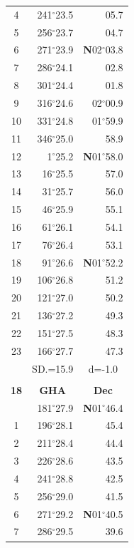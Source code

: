 \documentclass[10pt, a4paper]{report}
\begin{document}
\begin{scriptsize}
\begin{tabular*}{0.2\textwidth}[t]{@{\extracolsep{\fill}}|c|rr|}
4 & 241$^\circ$23.5 & 05.7\\
5 & 256$^\circ$23.7 & 04.7\\[2Pt]
6 & 271$^\circ$23.9 & \textbf{N}02$^\circ$03.8\\
7 & 286$^\circ$24.1 & 02.8\\
8 & 301$^\circ$24.4 & 01.8\\
9 & 316$^\circ$24.6 & 02$^\circ$00.9\\
10 & 331$^\circ$24.8 & 01$^\circ$59.9\\
11 & 346$^\circ$25.0 & 58.9\\[2Pt]
12 & 1$^\circ$25.2 & \textbf{N}01$^\circ$58.0\\
13 & 16$^\circ$25.5 & 57.0\\
14 & 31$^\circ$25.7 & 56.0\\
15 & 46$^\circ$25.9 & \raisebox{0.24ex}{\boldmath$\cdot$~\boldmath$\cdot$~~}55.1\\
16 & 61$^\circ$26.1 & 54.1\\
17 & 76$^\circ$26.4 & 53.1\\[2Pt]
18 & 91$^\circ$26.6 & \textbf{N}01$^\circ$52.2\\
19 & 106$^\circ$26.8 & 51.2\\
20 & 121$^\circ$27.0 & 50.2\\
21 & 136$^\circ$27.2 & \raisebox{0.24ex}{\boldmath$\cdot$~\boldmath$\cdot$~~}49.3\\
22 & 151$^\circ$27.5 & 48.3\\
23 & 166$^\circ$27.7 & 47.3\\
\hline
\rule{0pt}{2.4ex} & \multicolumn{1}{c}{SD.=15.9} & \multicolumn{1}{c|}{d=-1.0}\\
\hline
\multicolumn{1}{c}{}\\[-0.5ex]\hline
\multicolumn{1}{|c|}{\rule{0pt}{2.6ex}\textbf{18}} & \multicolumn{1}{c}{\textbf{GHA}} & \multicolumn{1}{c|}{\textbf{Dec}}\\
\hline\rule{0pt}{2.6ex}\noindent
0 & 181$^\circ$27.9 & \textbf{N}01$^\circ$46.4\\
1 & 196$^\circ$28.1 & 45.4\\
2 & 211$^\circ$28.4 & 44.4\\
3 & 226$^\circ$28.6 & \raisebox{0.24ex}{\boldmath$\cdot$~\boldmath$\cdot$~~}43.5\\
4 & 241$^\circ$28.8 & 42.5\\
5 & 256$^\circ$29.0 & 41.5\\[2Pt]
6 & 271$^\circ$29.2 & \textbf{N}01$^\circ$40.5\\
7 & 286$^\circ$29.5 & 39.6\\

\end{tabular*}
\end{scriptsize}
\end{document}
